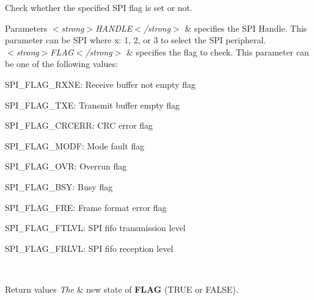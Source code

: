 Check whether the specified S\+PI flag is set or not. 


\begin{DoxyParams}{Parameters}
{\em $<$strong$>$\+H\+A\+N\+D\+L\+E$<$/strong$>$} & specifies the S\+PI Handle. This parameter can be S\+PI where x\+: 1, 2, or 3 to select the S\+PI peripheral. \\
\hline
{\em $<$strong$>$\+F\+L\+A\+G$<$/strong$>$} & specifies the flag to check. This parameter can be one of the following values\+: \begin{DoxyItemize}
\item S\+P\+I\+\_\+\+F\+L\+A\+G\+\_\+\+R\+X\+NE\+: Receive buffer not empty flag \item S\+P\+I\+\_\+\+F\+L\+A\+G\+\_\+\+T\+XE\+: Transmit buffer empty flag \item S\+P\+I\+\_\+\+F\+L\+A\+G\+\_\+\+C\+R\+C\+E\+RR\+: C\+RC error flag \item S\+P\+I\+\_\+\+F\+L\+A\+G\+\_\+\+M\+O\+DF\+: Mode fault flag \item S\+P\+I\+\_\+\+F\+L\+A\+G\+\_\+\+O\+VR\+: Overrun flag \item S\+P\+I\+\_\+\+F\+L\+A\+G\+\_\+\+B\+SY\+: Busy flag \item S\+P\+I\+\_\+\+F\+L\+A\+G\+\_\+\+F\+RE\+: Frame format error flag \item S\+P\+I\+\_\+\+F\+L\+A\+G\+\_\+\+F\+T\+L\+VL\+: S\+PI fifo transmission level \item S\+P\+I\+\_\+\+F\+L\+A\+G\+\_\+\+F\+R\+L\+VL\+: S\+PI fifo reception level \end{DoxyItemize}
\\
\hline
\end{DoxyParams}

\begin{DoxyRetVals}{Return values}
{\em The} & new state of {\bfseries F\+L\+AG} (T\+R\+UE or F\+A\+L\+SE). \\
\hline
\end{DoxyRetVals}
\mbox{\label{group___s_p_i___exported___macros_gabdaab061e4603331a0ec4b9d651df0b5}} 
